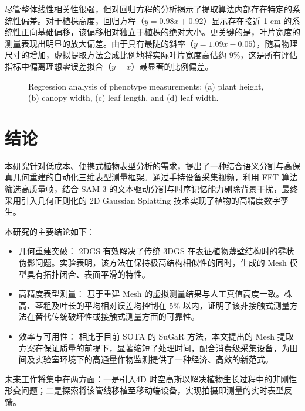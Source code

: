 \documentclass[preprint,12pt]{elsarticle}
\begin{document}
尽管整体线性相关性很强，但对回归方程的分析揭示了提取算法内部存在特定的系统性偏差。对于植株高度，回归方程（$y = 0.98x + 0.92$）显示存在接近 1 cm 的系统性正向基础偏移，该偏移相对独立于植株的绝对大小。更关键的是，叶片宽度的测量表现出明显的放大偏差。由于具有最陡的斜率（$y = 1.09x - 0.05$），随着物理尺寸的增加，虚拟提取方法会成比例地将实际叶片宽度高估约 9\%，这是所有评估指标中偏离理想零误差拟合（$y = x$）最显著的比例偏差。

\begin{figure}[t]
\centering
\caption{Regression analysis of phenotype measurements: (a) plant height, (b) canopy width, (c) leaf length, and (d) leaf width.}
\label{fig:image23}
\end{figure}

\section{结论}

本研究针对低成本、便携式植物表型分析的需求，提出了一种结合语义分割与高保真几何重建的自动化三维表型测量框架。通过手持设备采集视频，利用 FFT 算法筛选高质量帧，结合 SAM 3 的文本驱动分割与时序记忆能力剔除背景干扰，最终采用引入几何正则化的 2D Gaussian Splatting 技术实现了植物的高精度数字孪生。

本研究的主要结论如下：

\begin{itemize}
\item 几何重建突破： 2DGS 有效解决了传统 3DGS 在表征植物薄壁结构时的雾状伪影问题。实验表明，该方法在保持极高结构相似性的同时，生成的 Mesh 模型具有拓扑闭合、表面平滑的特性。
\item 高精度表型测量： 基于重建 Mesh 的虚拟测量结果与人工真值高度一致。株高、茎粗及叶长的平均相对误差均控制在 5\% 以内，证明了该非接触式测量方法在替代传统破坏性或接触式测量方面的可靠性。
\item 效率与可用性： 相比于目前 SOTA 的 SuGaR 方法，本文提出的 Mesh 提取方案在保证质量的前提下，显著缩短了处理时间，配合消费级采集设备，为田间及实验室环境下的高通量作物监测提供了一种经济、高效的新范式。
\end{itemize}

未来工作将集中在两方面：一是引入4D 时空高斯以解决植物生长过程中的非刚性形变问题；二是探索将该管线移植至移动端设备，实现拍摄即测量的实时表型反馈。
\end{document}
